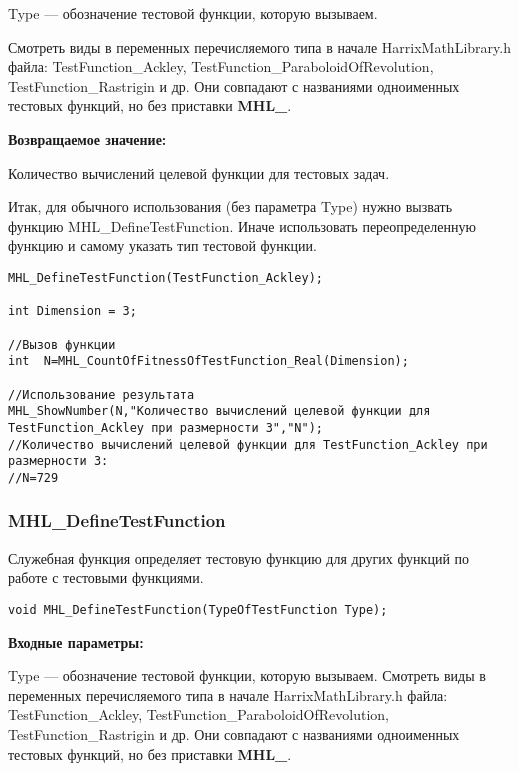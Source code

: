 \documentclass[a4paper,12pt]{article}
\begin{document}
Type --- обозначение тестовой функции, которую вызываем. 

Смотреть виды в переменных перечисляемого типа в начале HarrixMathLibrary.h файла: TestFunction\_Ackley, TestFunction\_ParaboloidOfRevolution, TestFunction\_Rastrigin и др. Они совпадают с названиями одноименных тестовых функций, но без приставки \textbf{MHL\_}.

\textbf{Возвращаемое значение:}
 
Количество вычислений целевой функции для тестовых задач.

Итак, для обычного использования (без параметра Type) нужно вызвать функцию MHL\_DefineTestFunction. Иначе использовать переопределенную функцию и самому указать тип тестовой функции.


\begin{lstlisting}[label=code_use_MHL_CountOfFitnessOfTestFunction_Real,caption=Пример использования]
MHL_DefineTestFunction(TestFunction_Ackley);

int Dimension = 3;

//Вызов функции
int  N=MHL_CountOfFitnessOfTestFunction_Real(Dimension);

//Использование результата
MHL_ShowNumber(N,"Количество вычислений целевой функции для TestFunction_Ackley при размерности 3","N");
//Количество вычислений целевой функции для TestFunction_Ackley при размерности 3:
//N=729
\end{lstlisting}

\subsubsection{MHL\_DefineTestFunction}\label{MHL_DefineTestFunction}

Служебная функция определяет тестовую функцию для других функций по работе с тестовыми функциями.


\begin{lstlisting}[label=code_syntax_MHL_DefineTestFunction,caption=Синтаксис]
void MHL_DefineTestFunction(TypeOfTestFunction Type);
\end{lstlisting}

\textbf{Входные параметры:}
  
Type --- обозначение тестовой функции, которую вызываем.
Смотреть виды в переменных перечисляемого типа в начале HarrixMathLibrary.h файла: TestFunction\_Ackley, TestFunction\_ParaboloidOfRevolution, TestFunction\_Rastrigin и др. Они совпадают с названиями одноименных тестовых функций, но без приставки \textbf{MHL\_}.
\end{document}
